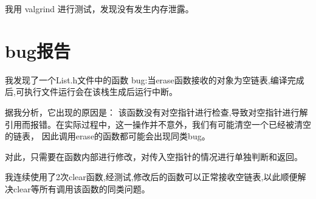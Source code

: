 \documentclass[UTF8]{ctexart}
\begin{document}
我用 valgrind 进行测试，发现没有发生内存泄露。

\section{bug报告}

我发现了一个List.h文件中的函数 bug:当erase函数接收的对象为空链表,编译完成后,可执行文件运行会在该栈生成后运行中断。\par
据我分析，它出现的原因是：
该函数没有对空指针进行检查,导致对空指针进行解引用而报错。在实际过程中，这一操作并不意外，我们有可能清空一个已经被清空的链表，
因此调用erase的函数都可能会出现同类bug。\par
对此，只需要在函数内部进行修改，对传入空指针的情况进行单独判断和返回。\par
我连续使用了2次clear函数,经测试,修改后的函数可以正常接收空链表,以此顺便解决clear等所有调用该函数的同类问题。\par
\end{document}

